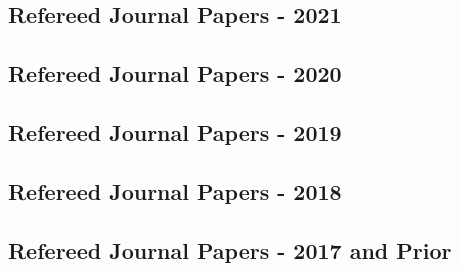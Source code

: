 \documentclass[11pt,a4paper,]{moderncv}
\begin{document}
\hypertarget{refs_journals2022}{}

\hypertarget{refereed-journal-papers---2021}{%
\subsection{\texorpdfstring{\textbf{Refereed Journal Papers -
2021}}{Refereed Journal Papers - 2021}}\label{refereed-journal-papers---2021}}

\hypertarget{refs_journals2021}{}

\vspace{7mm}

\hypertarget{refereed-journal-papers---2020}{%
\subsection{\texorpdfstring{\textbf{Refereed Journal Papers -
2020}}{Refereed Journal Papers - 2020}}\label{refereed-journal-papers---2020}}

\hypertarget{refs_journals2020}{}

\vspace{7mm}

\hypertarget{refereed-journal-papers---2019}{%
\subsection{\texorpdfstring{\textbf{Refereed Journal Papers -
2019}}{Refereed Journal Papers - 2019}}\label{refereed-journal-papers---2019}}

\hypertarget{refs_journals2019}{}

\vspace{7mm}

\hypertarget{refereed-journal-papers---2018}{%
\subsection{\texorpdfstring{\textbf{Refereed Journal Papers -
2018}}{Refereed Journal Papers - 2018}}\label{refereed-journal-papers---2018}}

\hypertarget{refs_journals2018}{}

\vspace{7mm}

\hypertarget{refereed-journal-papers---2017-and-prior}{%
\subsection{\texorpdfstring{\textbf{Refereed Journal Papers - 2017 and
Prior}}{Refereed Journal Papers - 2017 and Prior}}\label{refereed-journal-papers---2017-and-prior}}
\end{document}
